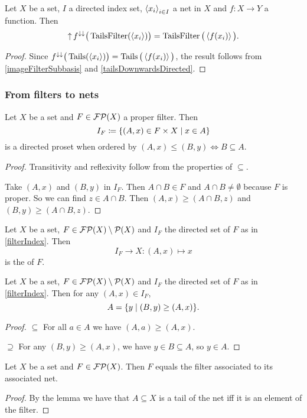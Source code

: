\begin{lemma} \label{imageTailsFilter}
Let $X$ be a set, $I$ a directed index set, $\left\langle x_i \right\rangle_{i\in I}$ a net in $X$ and $f:X\to Y$ a function. Then
\[ \operatorname{\uparrow} f^{\downarrow\downarrow}\big(\operatorname{TailsFilter}(\left\langle x_i \right\rangle)\big) = \operatorname{TailsFilter}\big(\left\langle f(x_i) \right\rangle\big). \]
\end{lemma}
\begin{proof}
Since $f^{\downarrow\downarrow}\big(\operatorname{Tails}(\left\langle x_i \right\rangle)\big) = \operatorname{Tails}\big(\left\langle f(x_i) \right\rangle\big)$, the result follows from 
\ref{imageFilterSubbasis} and \ref{tailsDownwardsDirected}.
\end{proof}


\subsubsection{From filters to nets}
\begin{lemma} \label{filterIndex}
Let $X$ be a set and $F\in\operatorname{\mathcal{FP}}(X)$ a proper filter. Then
\[ I_F \defeq \setbuilder{(A,x)\in F\times X}{x\in A} \]
is a directed proset when ordered by $(A,x)\leq (B,y) \iff B\subseteq A$.
\end{lemma}
\begin{proof}
Transitivity and reflexivity follow from the properties of $\subseteq$.

Take $(A,x)$ and $(B,y)$ in $I_F$. Then $A\cap B\in F$ and $A\cap B \neq \emptyset$ because $F$ is proper. So we can find $z\in A\cap B$. Then $(A,x) \geq (A\cap B,z)$ and $(B,y) \geq (A\cap B, z)$.
\end{proof}

\begin{definition}
Let $X$ be a set, $F\in\operatorname{\mathcal{FP}}(X)\setminus\operatorname{\mathcal{P}}(X)$ and $I_F$ the directed set of $F$ as in \ref{filterIndex}. Then
\[ I_F \to X: (A,x) \mapsto x \]
is the  of $F$.
\end{definition}

\begin{lemma} \label{tailsFilterIndex}
Let $X$ be a set, $F\in\operatorname{\mathcal{FP}}(X)\setminus\operatorname{\mathcal{P}}(X)$ and $I_F$ the directed set of $F$ as in \ref{filterIndex}. Then for any $(A,x)\in I_F$,
\[ A = \setbuilder{y}{(B,y) \geq (A,x)}. \]
\end{lemma}
\begin{proof}
$\boxed{\subseteq}$ For all $a\in A$ we have $(A,a)\geq (A,x)$.

$\boxed{\supseteq}$ For any $(B,y) \geq (A,x)$, we have $y\in B\subseteq A$, so $y\in A$.
\end{proof}
\begin{corollary}
Let $X$ be a set and $F\in\operatorname{\mathcal{FP}}(X)$. Then $F$ equals the filter associated to its associated net.
\end{corollary}
\begin{proof}
By the lemma we have that $A\subseteq X$ is a tail of the net iff it is an element of the filter.
\end{proof}

